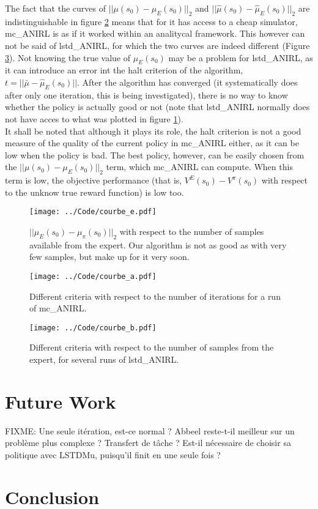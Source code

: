 \documentclass{article}
\begin{document}
The fact that  the curves of  $||\mu(s_0) - \mu_E(s_0)||_2$ and $||\hat\mu(s_0) - \hat\mu_E(s_0)||_2$ are indistinguishable in figure \ref{fig:A} means that for it has access to a cheap simulator, mc\_ANIRL is as if it worked within an analitycal framework. This however can not be said of lstd\_ANIRL, for which the two curves are indeed different (Figure \ref{fig:B}). Not knowing the true value of $\mu_E(s_0)$ may be a problem for lstd\_ANIRL, as it can introduce an error int the halt criterion of the algorithm, $t = ||\bar\mu-\hat\mu_E(s_0)||$. After the algorithm has converged (it systematically does after only one iteration, this is being investigated), there is no way to know whether the policy is actually good or not (note that lstd\_ANIRL normally does not have acces to what was plotted in figure \ref{fig:E}).\\

It shall be noted that although it plays its role, the halt criterion is not a good measure of the quality of the current policy in mc\_ANIRL either, as it can be low when the policy is bad. The best policy, however, can be easily chosen from the $||\mu(s_0) - \mu_E(s_0)||_2$ term, which mc\_ANIRL can compute. When this term is low, the objective performance (that is, $V^E(s_0)-V^\pi(s_0)$ with respect to the unknow true reward function) is low too.
\begin{figure}
\texttt{[image: ../Code/courbe\_e.pdf]}
\caption{$||\mu_E(s_0)-\mu_\pi(s_0)||_2$ with respect to the number of samples available from the expert. Our algorithm is not as good as \citet{abbeel2004apprenticeship} with very few samples, but make up for it very soon.}
\label{fig:E}
\end{figure}
\label{sec:perf}
\begin{figure}
\texttt{[image: ../Code/courbe\_a.pdf]}
\caption{Different criteria with respect to the number of iterations for a run of mc\_ANIRL.}
\label{fig:A}
\end{figure}
\begin{figure}
\texttt{[image: ../Code/courbe\_b.pdf]}
\caption{Different criteria with respect to the number of samples from the expert, for several runs of lstd\_ANIRL.}
\label{fig:B}
\end{figure}
\section{Future Work}
FIXME: Une seule itération, est-ce normal ? Abbeel reste-t-il meilleur sur un problème plus complexe ? Transfert de tâche ? Est-il nécessaire de choisir sa politique avec LSTDMu, puisqu'il finit en une seule fois ?
\section{Conclusion}


\end{document}
